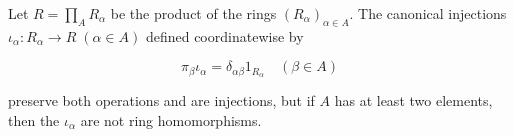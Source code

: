 Let $R = \prod_A R_\alpha$ be the product of the rings $(R_\alpha)_{\alpha \in A}$. The canonical injections $\iota_\alpha: R_\alpha \rightarrow R \; (\alpha \in A)$ defined coordinatewise by

$$\pi_\beta \iota_\alpha = \delta_{\alpha \beta} 1_{R_\alpha} \quad (\beta \in A)$$

preserve both operations and are injections, but if $A$ has at least two elements, then the $\iota_\alpha$ are not ring homomorphisms.
